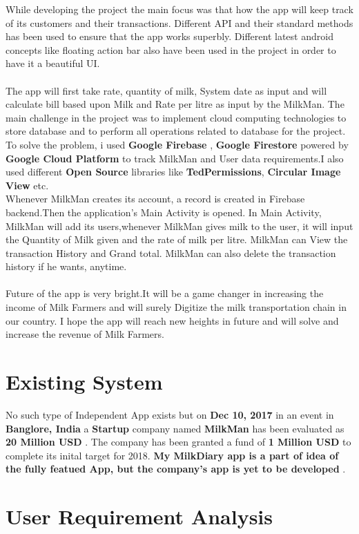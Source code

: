While developing the project the main focus was that how the app will keep track of its customers and their transactions. Different API and their standard methods has been used to ensure that the app works superbly. Different latest android concepts like floating action bar also have been used in the project in order to have it a beautiful UI.\\
\\
The app will first take rate, quantity of milk, System date as input and will calculate bill based upon Milk and Rate per litre as input by the MilkMan. The main challenge in the project was to implement cloud computing technologies to store database and to perform all operations related to database for the project. To solve the problem, i used \textbf{Google Firebase} , \textbf{Google Firestore}  powered by \textbf{Google Cloud Platform} to track MilkMan and User data requirements.I also used different \textbf{Open Source} libraries like \textbf{TedPermissions}, \textbf{Circular Image View} etc.\\

Whenever MilkMan creates its account, a record is created in Firebase backend.Then the application's Main Activity is opened. In Main Activity, MilkMan will add its users,whenever MilkMan gives milk to the user, it will input the Quantity of Milk given and the rate of milk per litre. MilkMan can View the transaction History and Grand total. MilkMan can also delete the transaction history if he wants, anytime.\\
\\
Future of the app is very bright.It will be a game changer in increasing the income of Milk Farmers and will surely Digitize the milk transportation chain in our country. I hope the app will reach new heights in future and will solve and increase the revenue of Milk Farmers.
\section{Existing System}

No such type of Independent App exists but on \textbf{Dec 10, 2017}  in an event in \textbf{Banglore, India} a \textbf{Startup} company named \textbf{MilkMan} has been evaluated as \textbf{20 Million USD} . The company has been granted a fund of \textbf{1 Million USD} to complete its inital target for 2018.  \textbf{My MilkDiary app is a part of idea of the fully featued App, but the company's app is yet to be developed} . \\
\section{User Requirement Analysis}
